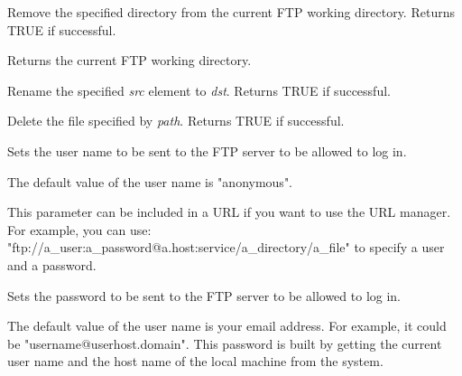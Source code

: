 Remove the specified directory from the current FTP working directory.
Returns TRUE if successful.



Returns the current FTP working directory.




Rename the specified {\it src} element to {\it dst}. Returns TRUE if successful.




Delete the file specified by {\it path}. Returns TRUE if successful.




Sets the user name to be sent to the FTP server to be allowed to log in.


The default value of the user name is "anonymous".


This parameter can be included in a URL if you want to use the URL manager.
For example, you can use: "ftp://a\_user:a\_password@a.host:service/a\_directory/a\_file"
to specify a user and a password.



Sets the password to be sent to the FTP server to be allowed to log in.


The default value of the user name is your email address. For example, it could
be "username@userhost.domain". This password is built by getting the current
user name and the host name of the local machine from the system.

